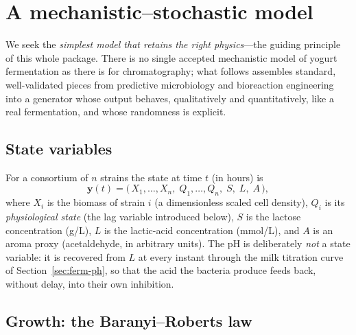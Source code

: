\section{A mechanistic--stochastic model}
\label{sec:ferm-model}

We seek the \emph{simplest model that retains the right physics}---the guiding
principle of this whole package. There is no single accepted mechanistic model of
yogurt fermentation as there is for chromatography; what follows assembles
standard, well-validated pieces from predictive microbiology and bioreaction
engineering into a generator whose output behaves, qualitatively and
quantitatively, like a real fermentation, and whose randomness is explicit.

\subsection{State variables}

For a consortium of $n$ strains the state at time $t$ (in hours) is
%
\begin{equation}
\bm y(t) = \bigl(\, X_1,\dots,X_n,\; Q_1,\dots,Q_n,\; S,\; L,\; A \,\bigr),
\end{equation}
%
where $X_i$ is the biomass of strain $i$ (a dimensionless scaled cell density),
$Q_i$ is its \emph{physiological state} (the lag variable introduced below), $S$
is the lactose concentration (g/L), $L$ is the lactic-acid concentration
(mmol/L), and $A$ is an aroma proxy (acetaldehyde, in arbitrary units). The pH is
deliberately \emph{not} a state variable: it is recovered from $L$ at every
instant through the milk titration curve of Section~\ref{sec:ferm-ph}, so that the
acid the bacteria produce feeds back, without delay, into their own inhibition.

\subsection{Growth: the Baranyi--Roberts law}

